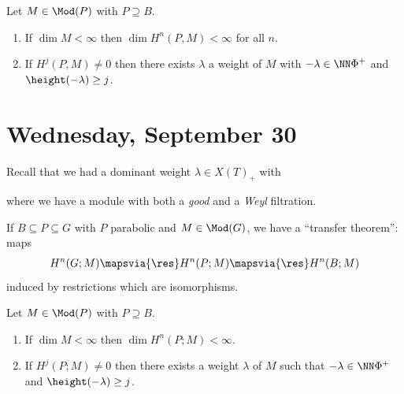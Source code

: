 \begin{proposition}[?]

Let \(M\in \Mod(P)\) with \(P\supseteq B\).

\begin{enumerate}
\def\labelenumi{\alph{enumi}.}
\item
  If \(\dim M < \infty\) then \(\dim H^n(P, M) < \infty\) for all \(n\).
\item
  If \(H^j(P, M) \neq 0\) then there exists \(\lambda\) a weight of
  \(M\) with \(-\lambda \in \NN \Phi^+\) and
  \(\height(-\lambda) \geq j\).
\end{enumerate}

\end{proposition}

\hypertarget{wednesday-september-30}{%
\section{Wednesday, September 30}\label{wednesday-september-30}}

Recall that we had a dominant weight \(\lambda \in X(T)_+\) with

\begin{center}
\end{center}

where we have a module with both a \emph{good} and a \emph{Weyl}
filtration.

If \(B\subseteq P \subseteq G\) with \(P\) parabolic and
\(M\in \Mod(G)\), we have a ``transfer theorem'': maps
\begin{align*}  
H^n(G; M) \mapsvia{\res} H^n(P; M) \mapsvia{\res} H^n(B; M)
\end{align*} induced by restrictions which are isomorphisms.

\begin{proposition}[?]

Let \(M\in \Mod(P)\) with \(P\supseteq B\).

\begin{enumerate}
\def\labelenumi{\alph{enumi}.}
\item
  If \(\dim M < \infty\) then \(\dim H^n(P; M) < \infty\).
\item
  If \(H^j(P; M) \neq 0\) then there exists a weight \(\lambda\) of
  \(M\) such that \(-\lambda \in \NN \Phi^+\) and
  \(\height(-\lambda) \geq j\).
\end{enumerate}

\end{proposition}

